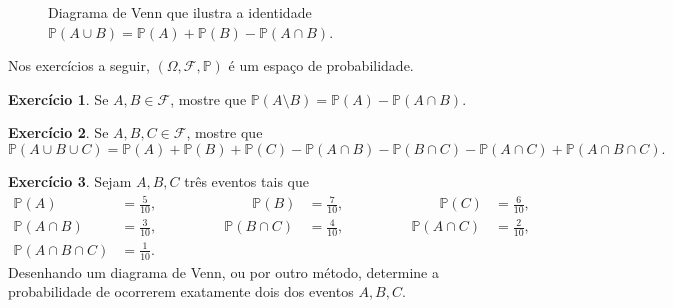 \documentclass[12pt,portuguese]{article}
\theoremstyle{definition}
\newtheorem{exercise}{Exercício}
\begin{document}
\begin{figure}[htbp]
\centering
{}
\caption{Diagrama de Venn que ilustra a identidade
\(\mathbb{P}(A \cup B) = \mathbb{P}(A) + \mathbb{P}(B) -
\mathbb{P}(A \cap B)\).}\label{fig:1.1}
\end{figure}


Nos exercícios a seguir, \((\Omega, \mathcal{F}, \mathbb{P})\) é um espaço de
probabilidade.

\begin{exercise}\label{exercise:1.19}
Se \(A, B \in \mathcal{F}\), mostre que
\(\mathbb{P}(A \setminus B) = \mathbb{P}(A) - \mathbb{P}(A \cap B)\).
\end{exercise}

\begin{exercise}\label{exercise:1.20}
Se \(A, B, C \in \mathcal{F}\), mostre que
\[
\mathbb{P}(A \cup B \cup C) = \mathbb{P}(A) + \mathbb{P}(B) +
\mathbb{P}(C) - \mathbb{P}(A \cap B) - \mathbb{P}(B \cap C) -
\mathbb{P}(A \cap C) + \mathbb{P}(A \cap B \cap C).
\]
\end{exercise}

\begin{exercise}\label{exercise:1.21}
Sejam \(A, B, C\) três eventos tais que
\[
\begin{alignedat}{3}
\mathbb{P}(A) &= \tfrac{5}{10}, &\qquad
\mathbb{P}(B) &= \tfrac{7}{10}, &\qquad
\mathbb{P}(C) &= \tfrac{6}{10}, \\
\mathbb{P}(A \cap B) &= \tfrac{3}{10},\qquad\qquad  &
\mathbb{P}(B \cap C) &= \tfrac{4}{10},\qquad \qquad  &
\mathbb{P}(A \cap C) &= \tfrac{2}{10}, \\
\mathbb{P}(A \cap B \cap C) &= \tfrac{1}{10}. &&
\end{alignedat}
\]
Desenhando um diagrama de Venn, ou por outro método, determine a
probabilidade de ocorrerem exatamente dois dos eventos \(A, B, C\).
\end{exercise}
\end{document}
